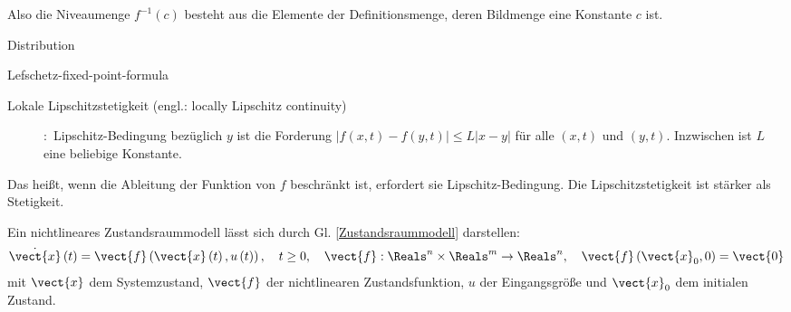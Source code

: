 \vspace{-0.8em}
Also die Niveaumenge $f^{-1}\left ( c \right )$ besteht aus die Elemente der Definitionsmenge, deren Bildmenge eine Konstante $c$ ist.
\begin{description}
	\item[Distribution]
\end{description}
\begin{description}
	\item[Lefschetz-fixed-point-formula]
\end{description}
\begin{description}
	\item[Lokale Lipschitzstetigkeit (engl.: locally Lipschitz continuity)]
	\cite[S.553]{bronstein2012taschenbuch}:~Lipschitz-Bedingung bezüglich $y$ ist die Forderung $\left | f\left ( x,t \right ) -f\left ( y,t \right )\right |\leq L\left | x-y \right |$ für alle $\left ( x,t \right )$ und $\left ( y,t \right )$. Inzwischen ist $L$ eine beliebige Konstante.
\end{description}
\vspace{-0.8em}
Das heißt, wenn die Ableitung der Funktion von $f$ beschränkt ist, erfordert sie Lipschitz-Bedingung. Die Lipschitzstetigkeit ist stärker als Stetigkeit.












Ein nichtlineares Zustandsraummodell lässt sich durch Gl. \ref{Zustandsraummodell} darstellen:
\begin{eqnarray}
\dot{\vect{x}}\left ( t \right )=\vect{f}\left (\vect{x}\left ( t \right ),u\left ( t \right )  \right ),~~~t\geq 0,~~~\vect{f}:\Reals^{n}\times\Reals^{m}\to\Reals^{n},~~~\vect{f}\left ({\vect{x}_{0}},0  \right )=\vect{0}
\label{Zustandsraummodell}
\end{eqnarray}
mit $\vect{x}$ dem Systemzustand, $\vect{f}$ der nichtlinearen Zustandsfunktion, $u$ der Eingangsgröße und $\vect{x}_{0}$ dem initialen Zustand. 

